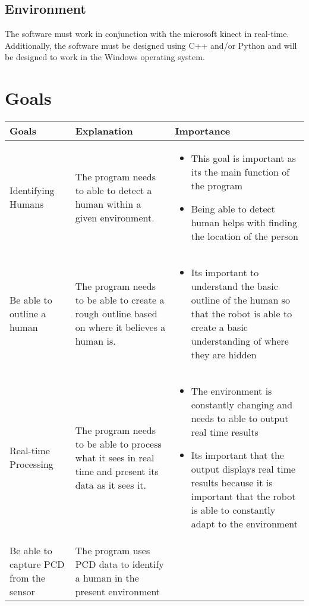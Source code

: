 \documentclass{article}
\begin{document}
\subsection{Environment}
The software must work in conjunction with the microsoft kinect in real-time. Additionally, the software must be designed using C++ and/or Python and will be designed to work in the Windows operating system.

\section{Goals}   
        \begin{tabular}{ |p{3cm}|p{3cm}|p{6cm}|  }
        \hline
        Goals & Explanation & Importance \\
        \hline
        Identifying Humans & The program needs to able to detect a human within a given environment.     & 
        \begin{itemize}
        \item This goal is important  as its the main function of the program
        \item Being able to detect human helps with finding the location of the person 
        \end{itemize}\\
        \hline
        Be able to outline a human & The program needs to be able to create a rough outline based on where it believes a human is.    & 
        \begin{itemize}
        \item Its important to understand the basic outline of the human so that the robot is able to create a basic understanding of where they are hidden
        \end{itemize}\\
        \hline
        Real-time Processing & The program needs to be able to process what it sees in real time and present its data as it sees it. & 
        \begin{itemize}
        \item The environment is constantly changing and needs to able to output real time results
        \item Its important that the output displays real time results because it is important that the robot is able to constantly adapt to the environment 
        \end{itemize}\\
        \hline
        Be able to capture  PCD from the sensor   & The program uses PCD data to identify a human in the present environment & 

\end{tabular}
\end{document}
